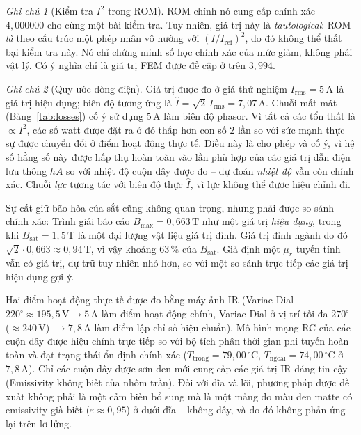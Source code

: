\documentclass[a4paper, 10pt, conference]{ieeeconf}
\theoremstyle{remark}
\newtheorem{remark}{Ghi chú}
\begin{document}
\begin{remark}[Kiểm tra $I^2$ trong ROM]
ROM chính nó cung cấp chính xác $4{,}000000$ cho cùng một bài kiểm tra. Tuy nhiên,
giá trị này là \emph{tautological}: ROM \emph{là} theo cấu trúc một phép nhân vô
hướng với $(I/I_{\mathrm{ref}})^2$, do đó không thể thất bại kiểm tra này. Nó chỉ
chứng minh số học chính xác của mức giảm, không phải vật lý. Có ý nghĩa chỉ là giá
trị FEM được đề cập ở trên $3{,}994$.
\end{remark}

\begin{remark}[Quy ước dòng điện]
\label{rem:current}
Giá trị được đo ở giá thử nghiệm $I_{\mathrm{rms}}=5\,\mathrm A$ là giá trị hiệu
dụng; biên độ tương ứng là $\hat I=\sqrt2\,I_{\mathrm{rms}}=7{,}07\,\mathrm A$.
Chuỗi mất mát (Bảng~\ref{tab:losses}) cố ý sử dụng $5\,\mathrm A$ làm biên độ phasor.
Vì tất cả các tổn thất là $\propto I^2$, các số watt được đặt ra ở đó thấp hơn con
số $2$ lần so với sức mạnh thực sự được chuyển đổi ở điểm hoạt động thực tế. Điều
này là cho phép và cố ý, vì hệ số hằng số này được hấp thụ hoàn toàn vào lần phù
hợp của các giá trị dẫn điện lưu thông $hA$ so với nhiệt độ cuộn dây được đo --
dự đoán \emph{nhiệt độ} vẫn còn chính xác. Chuỗi \emph{lực} tương tác với biên độ
thực $\hat I$, vì lực không thể được hiệu chỉnh đi.
\end{remark}

Sự cất giữ bão hòa của sắt cũng không quan trọng, nhưng phải được so sánh chính xác:
Trình giải báo cáo $B_{\max}=0{,}663\,\mathrm T$ như một giá trị \emph{hiệu dụng},
trong khi $B_{\mathrm{sat}}=1{,}5\,\mathrm T$ là một đại lượng vật liệu giá trị đỉnh.
Giá trị đỉnh ngành do đó $\sqrt2\cdot0{,}663 \approx 0{,}94\,\mathrm T$, vì vậy khoảng
$63\,\%$ của $B_{\mathrm{sat}}$. Giả định một $\mu_r$ tuyến tính vẫn có giá trị,
dự trữ tuy nhiên nhỏ hơn, so với một so sánh trực tiếp các giá trị hiệu dụng gợi ý.

Hai điểm hoạt động thực tế được đo bằng máy ảnh IR (Variac-Dial $220^\circ\approx195{,}5\,\mathrm V\to5\,\mathrm A$
làm điểm hoạt động chính, Variac-Dial ở vị trí tối đa $270^\circ$ ($\approx240\,\mathrm V$)
$\to7{,}8\,\mathrm A$ làm điểm lập chỉ số hiệu chuẩn). Mô hình mạng RC của các cuộn
dây được hiệu chỉnh trực tiếp so với bộ tích phân thời gian phi tuyến hoàn toàn và
đạt trạng thái ổn định chính xác ($T_{\mathrm{trong}}=79{,}00\,^\circ$C,
$T_{\mathrm{ngoài}}=74{,}00\,^\circ$C ở $7{,}8\,\mathrm A$). Chỉ các cuộn dây được
sơn đen mới cung cấp các giá trị IR đáng tin cậy (Emissivity không biết của nhôm trần).
Đối với đĩa và lõi, phương pháp được đề xuất không phải là một cảm biến bổ sung mà
là một mảng đo màu đen matte có emissivity già biết ($\varepsilon\approx0{,}95$) ở
dưới đĩa -- không dây, và do đó không phản ứng lại trên lơ lửng.
\end{document}
